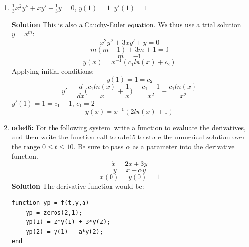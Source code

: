 \documentclass[letterpaper, fontsize=11pt]{scrartcl}
\numberwithin{equation}{section} %
\numberwithin{figure}{section} %
\numberwithin{table}{section} %
\begin{document}
\begin{enumerate}
\item $\frac{1}{3}x^2y'' + xy' + \frac{1}{3}y = 0 $, $y(1) = 1$, $y'(1) = 1$ \par
\textbf{Solution} \newline
This is also a Cauchy-Euler equation. We thus use a trial solution $y = x^m$:
$$x^2y'' + 3xy' + y = 0 $$
$$m(m-1) + 3m + 1 = 0 $$
$$ m = -1$$
$$y(x) = x^{-1}(c_1 ln(x) + c_2)$$
Applying initial conditions:
$$y(1) = 1 = c_2$$
$$y'= \frac{d}{dx}\Big(\frac{c_1 ln(x)}{x} + \frac{1}{x}\Big) = \frac{c_1 - 1}{x^2} - \frac{c_1 ln(x)}{x^2}$$
$y'(1) = 1 = c_1 - 1$, $c_1 = 2$
$$y(x) = x^{-1}(2 ln(x) + 1)$$
\item \textbf{ode45:} For the following system, write a function to evaluate the derivatives, and then write the function call to ode45 to store the numerical solution over the range $0\leq t \leq 10$. Be sure to pass $\alpha$ as a parameter into the derivative function.
$$ \dot{x}  =  2x + 3y$$
$$\dot{y} = x - \alpha y$$
$$ x(0) = y(0) = 1$$
\textbf{Solution} \newline
The derivative function would be:
\begin{lstlisting} 
function yp = f(t,y,a)
	yp = zeros(2,1);
	yp(1) = 2*y(1) + 3*y(2);
	yp(2) = y(1) - a*y(2);
end
\end{lstlisting}


\end{enumerate}
\end{document}
